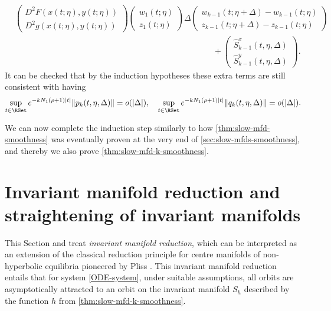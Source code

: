 \documentclass[a4paper]{siamart190516}
\begin{document}
\begin{align*}
&\begin{pmatrix} D^2 F(x(t;\eta),y(t;\eta))  \\  D^2 g(x(t;\eta), y(t;\eta)) \end{pmatrix}  \begin{pmatrix} w_1(t; \eta) \\ z_1(t; \eta )  \end{pmatrix} \Delta \begin{pmatrix}  w_{k-1}(t; \eta+\Delta) - w_{k-1}(t; \eta)\\  z_{k-1}(t;\eta+\Delta) -z_{k-1}(t; \eta) \end{pmatrix}   \\ 
&\qquad \qquad \qquad \qquad \qquad \qquad \qquad \qquad \qquad \qquad \qquad \qquad + \begin{pmatrix} \hat{S}^x_{k-1}(t, \eta, \Delta)  \\  \hat{S}^y_{k-1}(t, \eta, \Delta)  \end{pmatrix}.
\end{align*}
It can be checked that by the induction hypotheses these extra terms are still consistent with having 
\[
\sup_{t \in \RSet} e^{-kN_1(\rho+1)|t|}  \| p_k(t, \eta, \Delta)  \| =  o(|\Delta|), \quad \sup_{t \in \RSet} e^{-kN_1(\rho+1)|t|}  \| q_k(t, \eta, \Delta)  \| =  o(|\Delta|).
\]

We can now complete the induction step similarly to how 
\cref{thm:slow-mfd-smoothness} was eventually proven at the very end of 
\cref{sec:slow-mfds-smoothness}, and thereby we also prove 
\cref{thm:slow-mfd-k-smoothness}.


 
 
 

 \section{Invariant manifold reduction and straightening of invariant manifolds}\label{sec:slow-mfds-straightening}
 
 This Section and  treat
 \textit{invariant manifold reduction}, which can be interpreted as an extension of the
 classical reduction principle for centre manifolds of non-hyperbolic equilibria
 pioneered by Pliss \cite{Pl64}. This invariant manifold reduction entails that for system
 \cref{ODE-system}, under suitable assumptions, all orbits are asymptotically
 attracted to an orbit on the invariant manifold $S_h$ described by the function $h$ from
 \cref{thm:slow-mfd-k-smoothness}. 
\end{document}
